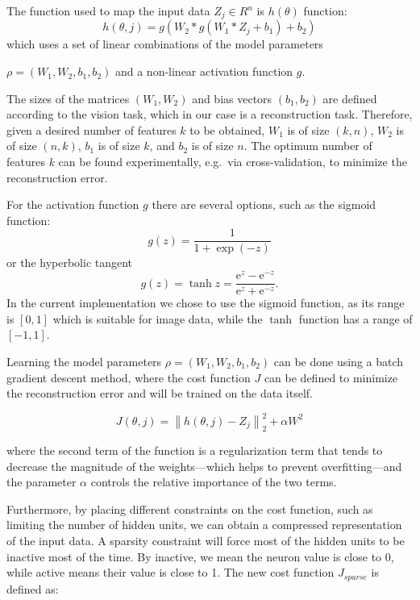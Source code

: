 \documentclass[runningheads]{llncs}
\begin{document}
The function used to map the input data $Z_j\in R^n$ is $h(\theta)$ function:
\begin{equation}
 h(\theta,j)= g(W_2*g(W_1*Z_j+b_1)+b_2)
\end{equation}
which uses a set of linear combinations of the model parameters 

$\rho=(W_1,W_2,b_1,b_2)$ and a non-linear activation function $g$.

The sizes of the matrices $(W_1,W_2)$ and bias vectors $(b_1,b_2)$ are defined according to the vision task, which in our case is a reconstruction task. Therefore, given a desired number of features $k$ to be obtained, $W_1$ is of size $(k,n)$, $W_2$ is of size $(n,k)$, $b_1$ is of size $k$, and $b_2$ is of size $n$. The optimum number of features $k$ can be found experimentally, e.g.\ via cross-validation, to minimize the reconstruction error.

For the activation function $g$ there are several options, such as the sigmoid function:
\begin{equation}
  g(z)=\frac{1}{1+\exp(-z)}
\end{equation}
or the hyperbolic tangent
\begin{equation}
  g(z)=\tanh z=\frac{\text{e}^z-\text{e}^{-z}}{\text{e}^z+\text{e}^{-z}}.
\end{equation}
In the current implementation we chose to use the sigmoid function, as its range is $[0,1]$ which is suitable for image data, while the $\tanh$ function has a range of $[-1,1]$.

Learning the model parameters $\rho=(W_1,W_2,b_1,b_2)$ can be done using a batch gradient descent method, where the cost function $J$ can be defined to minimize the reconstruction error and will be trained on the data itself.

\begin{equation}
   J(\theta,j)=\left\|h(\theta,j)-Z_j\right\|_2^2 + \alpha W^2
\end{equation}

where the second term of the function is a regularization term that tends to decrease the magnitude of the weights---which helps to prevent overfitting---and the parameter $\alpha$ controls the relative importance of the two terms.
 
Furthermore, by placing different constraints on the cost function, such as limiting the number of hidden units, we can obtain a compressed representation of the input data. A sparsity constraint will force most of the hidden units to be inactive most of the time. By inactive, we mean the neuron value is close to 0, while active means their value is close to 1. The new cost function $J_{sparse}$ is defined as:
\end{document}
